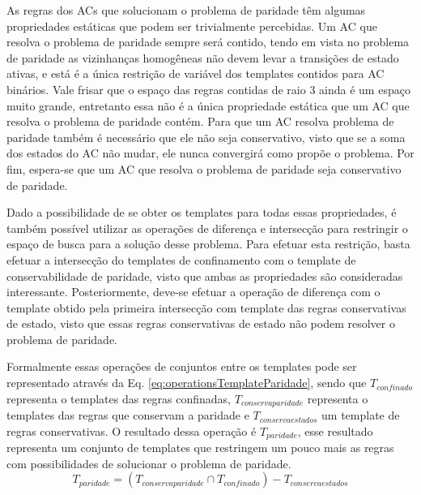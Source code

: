 As regras dos ACs que solucionam o problema de paridade têm algumas propriedades estáticas que podem ser trivialmente percebidas. 
Um AC que resolva o problema de paridade sempre será contido, tendo em vista no problema de paridade as vizinhanças homogêneas não devem levar a transições de estado ativas, e está é a única restrição de variável dos templates contidos para AC binários. 
Vale frisar que o espaço das regras contidas de raio 3 ainda é um espaço muito grande, entretanto essa não é a única propriedade estática que um AC que resolva o problema de paridade contém. 
Para que um AC resolva problema de paridade também é necessário que ele não seja conservativo, visto que se a soma dos estados do AC não mudar, ele nunca convergirá como propõe o problema. 
Por fim, espera-se que um AC que resolva o problema de paridade seja conservativo de paridade.

Dado a possibilidade de se obter os templates para todas essas propriedades, é também possível utilizar as operações de diferença e intersecção para restringir o espaço de busca para a solução desse problema.
Para efetuar esta restrição, basta efetuar a intersecção do templates de confinamento com o template de conservabilidade de paridade, visto que ambas as propriedades são consideradas interessante. 
Posteriormente, deve-se efetuar a operação de diferença com o template obtido pela primeira intersecção com template das regras conservativas de estado, visto que essas regras conservativas de estado não podem resolver o problema de paridade.

Formalmente essas operações de conjuntos entre os templates pode ser representado através da Eq. \eqref{eq:operationsTemplateParidade}, sendo que $T_{confinado}$ representa o templates das regras confinadas, $T_{conservaparidade}$ representa o templates das regras que conservam a paridade e ${T}_{conservaestados}$ um template de regras conservativas. O resultado dessa operação é $T_{paridade}$, esse resultado representa um conjunto de templates que restringem um pouco mais as regras com possibilidades de solucionar o problema de paridade.
\begin{equation}
T_{paridade} = (T_{conservaparidade} \cap T_{confinado}) - {T}_{conservaestados}
\label{eq:operationsTemplateParidade}
\end{equation}